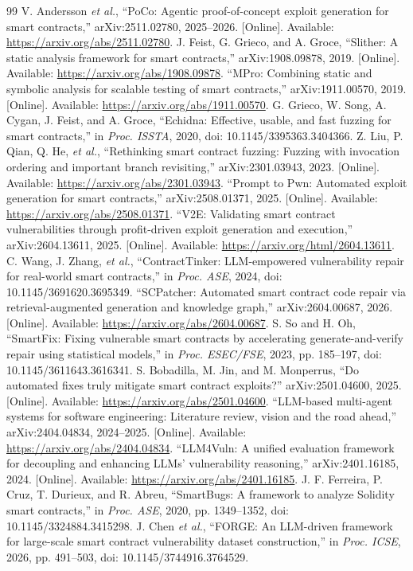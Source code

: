 \documentclass[conference,a4paper,10pt]{IEEEtran}
\begin{document}
\begin{thebibliography}{99}
 V. Andersson \emph{et al.}, ``PoCo: Agentic proof-of-concept exploit generation for smart contracts,'' arXiv:2511.02780, 2025--2026. [Online]. Available: \url{https://arxiv.org/abs/2511.02780}.
 J. Feist, G. Grieco, and A. Groce, ``Slither: A static analysis framework for smart contracts,'' arXiv:1908.09878, 2019. [Online]. Available: \url{https://arxiv.org/abs/1908.09878}.
 ``MPro: Combining static and symbolic analysis for scalable testing of smart contracts,'' arXiv:1911.00570, 2019. [Online]. Available: \url{https://arxiv.org/abs/1911.00570}.
 G. Grieco, W. Song, A. Cygan, J. Feist, and A. Groce, ``Echidna: Effective, usable, and fast fuzzing for smart contracts,'' in \emph{Proc. ISSTA}, 2020, doi: 10.1145/3395363.3404366.
 Z. Liu, P. Qian, Q. He, \emph{et al.}, ``Rethinking smart contract fuzzing: Fuzzing with invocation ordering and important branch revisiting,'' arXiv:2301.03943, 2023. [Online]. Available: \url{https://arxiv.org/abs/2301.03943}.
 ``Prompt to Pwn: Automated exploit generation for smart contracts,'' arXiv:2508.01371, 2025. [Online]. Available: \url{https://arxiv.org/abs/2508.01371}.
 ``V2E: Validating smart contract vulnerabilities through profit-driven exploit generation and execution,'' arXiv:2604.13611, 2025. [Online]. Available: \url{https://arxiv.org/html/2604.13611}.
 C. Wang, J. Zhang, \emph{et al.}, ``ContractTinker: LLM-empowered vulnerability repair for real-world smart contracts,'' in \emph{Proc. ASE}, 2024, doi: 10.1145/3691620.3695349.
 ``SCPatcher: Automated smart contract code repair via retrieval-augmented generation and knowledge graph,'' arXiv:2604.00687, 2026. [Online]. Available: \url{https://arxiv.org/abs/2604.00687}.
 S. So and H. Oh, ``SmartFix: Fixing vulnerable smart contracts by accelerating generate-and-verify repair using statistical models,'' in \emph{Proc. ESEC/FSE}, 2023, pp. 185--197, doi: 10.1145/3611643.3616341.
 S. Bobadilla, M. Jin, and M. Monperrus, ``Do automated fixes truly mitigate smart contract exploits?'' arXiv:2501.04600, 2025. [Online]. Available: \url{https://arxiv.org/abs/2501.04600}.
 ``LLM-based multi-agent systems for software engineering: Literature review, vision and the road ahead,'' arXiv:2404.04834, 2024--2025. [Online]. Available: \url{https://arxiv.org/abs/2404.04834}.
 ``LLM4Vuln: A unified evaluation framework for decoupling and enhancing LLMs' vulnerability reasoning,'' arXiv:2401.16185, 2024. [Online]. Available: \url{https://arxiv.org/abs/2401.16185}.
 J. F. Ferreira, P. Cruz, T. Durieux, and R. Abreu, ``SmartBugs: A framework to analyze Solidity smart contracts,'' in \emph{Proc. ASE}, 2020, pp. 1349--1352, doi: 10.1145/3324884.3415298.
 J. Chen \emph{et al.}, ``FORGE: An LLM-driven framework for large-scale smart contract vulnerability dataset construction,'' in \emph{Proc. ICSE}, 2026, pp. 491--503, doi: 10.1145/3744916.3764529.
\end{thebibliography}
\end{document}
